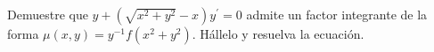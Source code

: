 Demuestre que $y+(\sqrt{x^2+y^2}-x)y^{\prime}=0$ admite un factor integrante de la forma $\mu(x,y)=y^{-1}f(x^2+y^2)$. Hállelo y resuelva la ecuación.
